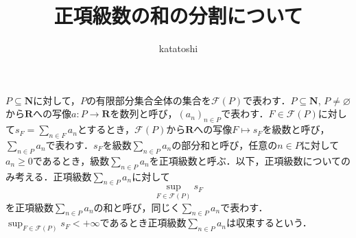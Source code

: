 \documentclass[12pt,a4paper]{jsarticle}
\newcommand{\nat}{\mathbf{N}}
\newcommand{\real}{\mathbf{R}}
\newcommand{\calF}{\mathcal{F}}
\begin{document}
\title{正項級数の和の分割について}
\author{katatoshi}
\maketitle

$P \subseteq \nat$に対して，$P$の有限部分集合全体の集合を$\calF(P)$で表わす．$P \subseteq \nat$, $P \not= \varnothing$から$\real$への写像$a\colon P \to \real$を数列と呼び，$(a_n)_{n \in P}$で表わす．$F \in \calF(P)$に対して$s_F = \sum_{n \in F} a_n$とするとき，$\calF(P)$から$\real$への写像$F \mapsto s_F$を級数と呼び，$\sum_{n \in P} a_n$で表わす．$s_F$を級数$\sum_{n \in P} a_n$の部分和と呼び，任意の$n \in P$に対して$a_n \geq 0$であるとき，級数$\sum_{n \in P} a_n$を正項級数と呼ぶ．以下，正項級数についてのみ考える．正項級数$\sum_{n \in P} a_n$に対して
\begin{equation*}
    \sup_{F \in \calF(P)} s_F
\end{equation*}
を正項級数$\sum_{n \in P} a_n$の和と呼び，同じく$\sum_{n \in P} a_n$で表わす．$\sup_{F \in \calF(P)} s_F < +\infty$であるとき正項級数$\sum_{n \in P} a_n$は収束するという．
\end{document}

